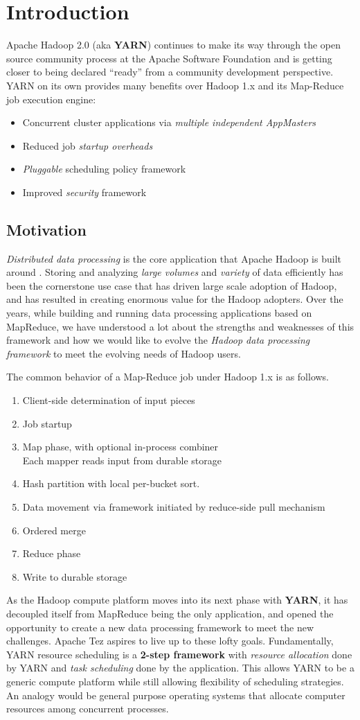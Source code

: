 \documentclass[twocolumn]{article}
\newcommand{\bi}{\begin{itemize}}
\newcommand{\ei}{\end{itemize}}
\newcommand{\be}{\begin{enumerate}}
\newcommand{\ee}{\end{enumerate}}
\newcommand{\ii}{\item}
\begin{document}
\section{Introduction}
Apache Hadoop 2.0 (aka \textbf{YARN}) continues to make its way through the open source community process at the Apache Software Foundation and is getting closer to being declared “ready” from a community development perspective.  YARN on its own provides many benefits over Hadoop 1.x and its Map-Reduce job execution engine:

\bi
\ii Concurrent cluster applications via \textit{multiple independent AppMasters}
\ii Reduced job \textit{startup overheads}
\ii \textit{Pluggable} scheduling policy framework
\ii Improved \textit{security} framework
\ei

\subsection{Motivation}

\emph{Distributed data processing} is the core application that Apache
Hadoop is built around \cite{FOWLER:2013}.  Storing and analyzing \emph{large volumes} and
\emph{variety} of data efficiently has been the cornerstone use case
that has driven large scale adoption of Hadoop, and has resulted in
creating enormous value for the Hadoop adopters. Over the years, while
building and running data processing applications based on MapReduce, we
have understood a lot about the strengths and weaknesses of this
framework and how we would like to evolve the \emph{Hadoop data
processing framework} to meet the evolving needs of Hadoop users. 

The common behavior of a Map-Reduce job under Hadoop 1.x is as follows.
\be
\ii Client-side determination of input pieces
\ii Job startup
\ii Map phase, with optional in-process combiner \\
Each mapper reads input from durable storage
\ii Hash partition with local per-bucket sort.
\ii Data movement via framework initiated by reduce-side pull mechanism
\ii Ordered merge
\ii Reduce phase
\ii Write to durable storage
\ee

As the Hadoop compute platform moves into its next phase with \textbf{YARN}, it
has decoupled itself from MapReduce being the only application, and
opened the opportunity to create a new data processing framework to meet
the new challenges. Apache Tez aspires to live up to these lofty goals.
Fundamentally, YARN resource scheduling is a \textbf{2-step framework} with \textit{resource allocation} done by YARN and \textit{task scheduling} done by the application. This allows YARN to be a generic compute platform while still allowing flexibility of scheduling strategies. An analogy would be general purpose operating systems that allocate computer resources among concurrent processes.
\end{document}
